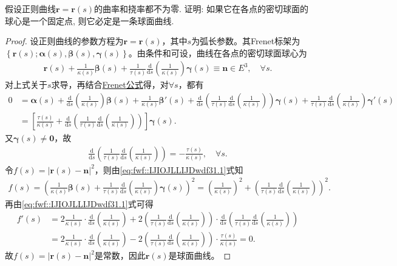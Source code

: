 \documentclass[../../main.tex]{subfiles}%
\begin{document}
\begin{example}
假设正则曲线$\bm{r} = \bm{r}(s)$的曲率和挠率都不为零. 证明: 如果它在各点的密切球面的球心是一个固定点, 则它必定是一条球面曲线.
\end{example}
\begin{proof}
设正则曲线的参数方程为$\bm{r}=\bm{r}(s)$，其中$s$为弧长参数。其Frenet标架为$\left\{ \bm{r}(s); \bm{\alpha}(s), \bm{\beta}(s), \bm{\gamma}(s) \right\}$。由条件和可设，曲线在各点的密切球面球心为
\begin{align}
\bm{r}(s) + \frac{1}{\kappa(s)}\bm{\beta}(s) + \frac{1}{\tau(s)}\frac{\mathrm{d}}{\mathrm{d}s}\left( \frac{1}{\kappa(s)} \right) \bm{\gamma}(s) \equiv \bm{n}\in E^3,\quad \forall s.
\label{eq:fwf::IJIOJLLIJDwdf31.1}
\end{align}
对上式关于$s$求导，再结合\hyperref[theorem:微分几何-Frenet公式]{Frenet公式}得，对$\forall s$，都有
\begin{align*}
0&=\bm{\alpha}(s) +\frac{\mathrm{d}}{\mathrm{d}s}\left( \frac{1}{\kappa(s)} \right) \bm{\beta}(s) +\frac{1}{\kappa(s)}\bm{\beta}'(s) +\frac{\mathrm{d}}{\mathrm{d}s}\left( \frac{1}{\tau(s)}\frac{\mathrm{d}}{\mathrm{d}s}\left( \frac{1}{\kappa(s)} \right) \right) \bm{\gamma}(s) +\frac{1}{\tau(s)}\frac{\mathrm{d}}{\mathrm{d}s}\left( \frac{1}{\kappa(s)} \right) \bm{\gamma}'(s) \\
&=\left[ \frac{\tau(s)}{\kappa(s)}+\frac{\mathrm{d}}{\mathrm{d}s}\left( \frac{1}{\tau(s)}\frac{\mathrm{d}}{\mathrm{d}s}\left( \frac{1}{\kappa(s)} \right) \right) \right] \bm{\gamma}(s).
\end{align*}
又$\bm{\gamma}(s) \ne \bm{0}$，故
\begin{align}
\frac{\mathrm{d}}{\mathrm{d}s}\left( \frac{1}{\tau(s)}\frac{\mathrm{d}}{\mathrm{d}s}\left( \frac{1}{\kappa(s)} \right) \right) =-\frac{\tau(s)}{\kappa(s)},\quad \forall s.
\label{eq:fwf::IJIOJLLIJDwdf31.2}
\end{align}
令$f(s)=\left| \bm{r}(s)-\bm{n} \right|^2$，则由\eqref{eq:fwf::IJIOJLLIJDwdf31.1}式知
\begin{align*}
f(s)=\left( \frac{1}{\kappa(s)}\bm{\beta}(s) +\frac{1}{\tau(s)}\frac{\mathrm{d}}{\mathrm{d}s}\left( \frac{1}{\kappa(s)} \right) \bm{\gamma}(s) \right) ^2=\left( \frac{1}{\kappa(s)} \right) ^2+\left( \frac{1}{\tau(s)}\frac{\mathrm{d}}{\mathrm{d}s}\left( \frac{1}{\kappa(s)} \right) \right) ^2.
\end{align*}
再由\eqref{eq:fwf::IJIOJLLIJDwdf31.1}式可得
\begin{align*}
f'(s)&=2\frac{1}{\kappa(s)}\cdot \frac{\mathrm{d}}{\mathrm{d}s}\left( \frac{1}{\kappa(s)} \right) +2\left( \frac{1}{\tau(s)}\frac{\mathrm{d}}{\mathrm{d}s}\left( \frac{1}{\kappa(s)} \right) \right) \cdot \frac{\mathrm{d}}{\mathrm{d}s}\left( \frac{1}{\tau(s)}\frac{\mathrm{d}}{\mathrm{d}s}\left( \frac{1}{\kappa(s)} \right) \right) \\
&=2\frac{1}{\kappa(s)}\cdot \frac{\mathrm{d}}{\mathrm{d}s}\left( \frac{1}{\kappa(s)} \right) -2\left( \frac{1}{\tau(s)}\frac{\mathrm{d}}{\mathrm{d}s}\left( \frac{1}{\kappa(s)} \right) \right) \cdot \frac{\tau(s)}{\kappa(s)}=0.
\end{align*}
故$f(s)=\left| \bm{r}(s)-\bm{n} \right|^2$是常数，因此$\bm{r}(s)$是球面曲线。
\end{proof}
\end{document}
